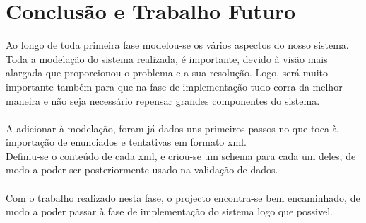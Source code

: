 \chapter{Conclusão e Trabalho Futuro}\label{chap con} 
Ao longo de toda primeira fase modelou-se os vários aspectos do nosso sistema.
Toda a modelação do sistema realizada, é importante, devido à visão mais alargada que proporcionou o problema e a sua resolução.
Logo, será muito importante também para que na fase de implementação tudo corra da melhor maneira e não seja necessário repensar grandes componentes
do sistema.\\ 
\\
A adicionar à modelação, foram já dados uns primeiros passos no que toca à importação de enunciados e tentativas em formato xml.\\
Definiu-se o conteúdo de cada xml, e criou-se um schema para cada um deles, de modo a poder ser posteriormente usado na validação de dados.\\
\\
Com o trabalho realizado nesta fase, o projecto encontra-se bem encaminhado, de modo a poder passar à fase de implementação do sistema logo que possivel.
